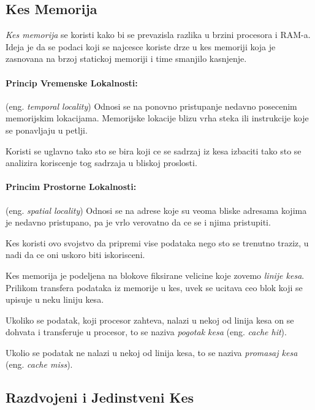 \documentclass[12p,a4paper]{article}
\begin{document}
\begin{multicols}{2}
    \section{Kes Memorija}

    \emph{Kes memorija} se koristi kako bi se prevazisla razlika u brzini
    procesora i RAM-a. Ideja je da se podaci koji se najcesce koriste
    drze u kes memoriji koja je zasnovana na brzoj statickoj memoriji i time
    smanjilo kasnjenje.

    \paragraph{Princip Vremenske Lokalnosti:} (eng. \emph{temporal locality}) 
    Odnosi se na ponovno pristupanje nedavno posecenim memorijskim lokacijama.
    Memorijske lokacije blizu vrha steka ili instrukcije koje se ponavljaju u
    petlji.

    Koristi se uglavno tako sto se bira koji ce se sadrzaj iz kesa izbaciti
    tako sto se analizira koriscenje tog sadrzaja u bliskoj proslosti.
    
    \paragraph{Princim Prostorne Lokalnosti:} (eng. \emph{spatial locality})
    Odnosi se na adrese koje su veoma bliske adresama kojima je nedavno
    pristupano, pa je vrlo verovatno da ce se i njima pristupiti.

    Kes koristi ovo svojstvo da pripremi vise podataka nego sto se trenutno
    traziz, u nadi da ce oni uskoro biti iskorisceni.

    Kes memorija je podeljena na blokove 
    fiksirane velicine koje zovemo \emph{linije kesa}. Prilikom transfera
    podataka iz memorije u kes, uvek se ucitava ceo blok koji se upisuje u
    neku liniju kesa.

    Ukoliko se podatak, koji procesor zahteva, nalazi u nekoj od linija kesa 
    on se dohvata i transferuje u procesor, to se naziva \emph{pogotak kesa}
    (eng. \emph{cache hit}). 

    Ukolio se podatak ne nalazi u nekoj od linija kesa, to se naziva
    \emph{promasaj kesa} (eng. \emph{cache miss}).
    
    \subsection{Razdvojeni i Jedinstveni Kes} 


\end{multicols}
\end{document}
